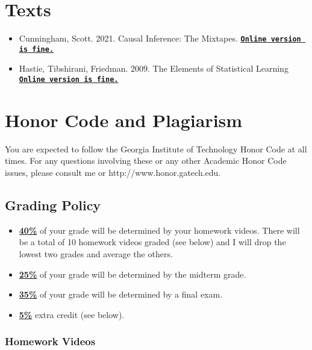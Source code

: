 \documentclass[11pt]{article}
\begin{document}
\section*{Texts}

\begin{itemize}
\item Cunningham, Scott. 2021. Causal Inference: The Mixtapes.  \href{https://mixtape.scunning.com/}{\tt\bf  Online version is fine.} 

\item Hastie, Tibshirani, Friedman. 2009.  The Elements of Statistical Learning  \href{https://hastie.su.domains/ElemStatLearn/}{\tt\bf  Online version is fine.} 

\end{itemize} 


\section*{Honor Code and Plagiarism}
You are expected to follow the Georgia Institute of Technology Honor Code at all times. 
For any questions involving these or any other Academic Honor Code issues, please consult me or
http://www.honor.gatech.edu.


\subsection*{Grading Policy}
\begin{itemize}
\item \underline{\textbf{40\%}} of your grade will be determined by your homework videos. There will be a total of 10 homework videos graded (see below) and I will drop the lowest two grades and average the others. 
\item \underline{\textbf{25\%}} of your grade will be determined by the midterm grade. 
\item \underline{\textbf{35\%}} of your grade will be determined by a final exam.
\item \underline{\textbf{5\%}} extra credit (see below). 
\end{itemize}

\subsubsection*{Homework Videos}
\end{document}
